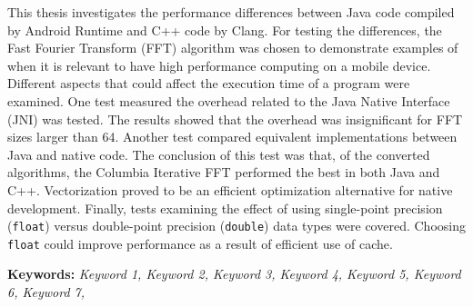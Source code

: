 This thesis investigates the performance differences between Java code compiled by Android Runtime and C++ code by Clang. For testing the differences, the Fast Fourier Transform (FFT) algorithm was chosen to demonstrate examples of when it is relevant to have high performance computing on a mobile device. Different aspects that could affect the execution time of a program were examined. One test measured the overhead related to the Java Native Interface (JNI) was tested. The results showed that the overhead was insignificant for FFT sizes larger than 64. Another test compared equivalent implementations between Java and native code. The conclusion of this test was that, of the converted algorithms, the Columbia Iterative FFT performed the best in both Java and C++. Vectorization proved to be an efficient optimization alternative for native development. Finally, tests examining the effect of using single-point precision (\texttt{float}) versus double-point precision (\texttt{double}) data types were covered. Choosing \texttt{float} could improve performance as a result of efficient use of cache.


\textbf{Keywords:} \emph{Keyword 1, Keyword 2, Keyword 3, Keyword 4, Keyword 5, Keyword 6, Keyword 7, }
